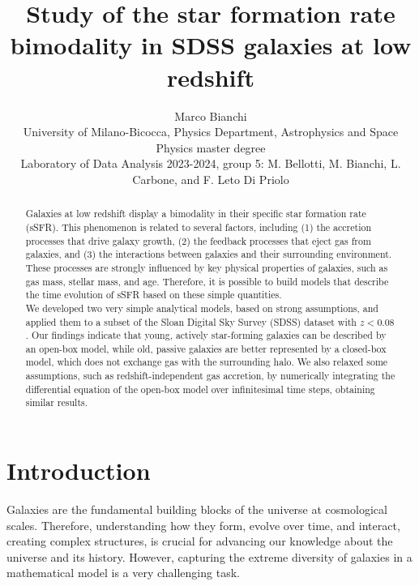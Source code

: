 \documentclass[fleqn,usenatbib]{mnras}
\title[]{Study of the star formation rate bimodality in SDSS galaxies at low redshift}
\author[Marco Bianchi]{
Marco Bianchi
\\
University of Milano-Bicocca, Physics Department, Astrophysics and Space Physics master degree\\
Laboratory of Data Analysis 2023-2024, group 5: M. Bellotti, M. Bianchi, L. Carbone, and F. Leto Di Priolo
}
\begin{document}
\label{firstpage}
\pagerange{\pageref{firstpage}--\pageref{lastpage}}
\maketitle

\begin{abstract}
Galaxies at low redshift display a bimodality in their specific star formation rate (sSFR). This phenomenon is related to several factors, including (1) the accretion processes that drive galaxy growth, (2) the feedback processes that eject gas from galaxies, and (3) the interactions between galaxies and their surrounding environment. These processes are strongly influenced by key physical properties of galaxies, such as gas mass, stellar mass, and age. Therefore, it is possible to build models that describe the time evolution of sSFR based on these simple quantities. \\
We developed two very simple analytical models, based on strong assumptions, and applied them to a subset of the Sloan Digital Sky Survey (SDSS) dataset with $z<0.08$. Our findings indicate that young, actively star-forming galaxies can be described by an open-box model, while old, passive galaxies are better represented by a closed-box model, which does not exchange gas with the surrounding halo. We also relaxed some assumptions, such as redshift-independent gas accretion, by numerically integrating the differential equation of the open-box model over infinitesimal time steps, obtaining similar results.
\smallskip
\end{abstract} 





\section{Introduction}\label{sec:introduction}
Galaxies are the fundamental building blocks of the universe at cosmological scales. Therefore, understanding how they form, evolve over time, and interact, creating complex structures, is crucial for advancing our knowledge about the universe and its history. However, capturing the extreme diversity of galaxies in a mathematical model is a very challenging task.
\end{document}
